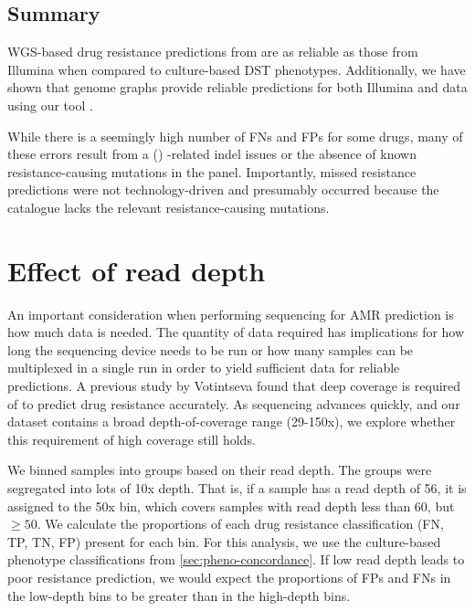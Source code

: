 \subsection{Summary}

WGS-based drug resistance predictions from \ont{} are as reliable as those from Illumina when compared to culture-based DST phenotypes. Additionally, we have shown that genome graphs provide reliable predictions for both Illumina and \ont{} data using our tool \drprg{}.

While there is a seemingly high number of FNs and FPs for some drugs, many of these errors result from a (\mykrobe{}) \ont{}-related indel issues or the absence of known resistance-causing mutations in the panel. Importantly, missed resistance predictions were not technology-driven and presumably occurred because the catalogue lacks the relevant resistance-causing mutations.

\section{Effect of \ont{} read depth}
\label{sec:dst-covg}

An important consideration when performing \ont{} sequencing for AMR prediction is how much data is needed. The quantity of data required has implications for how long the \ont{} sequencing device needs to be run or how many samples can be multiplexed in a single run in order to yield sufficient data for reliable predictions. A previous study by Votintseva \etal{} found that deep coverage is required of \ont{} to predict drug resistance accurately\cite{Votintseva2017}. As \ont{} sequencing advances quickly, and our dataset contains a broad \ont{} depth-of-coverage range (29-150x), we explore whether this requirement of high coverage still holds. 

We binned samples into groups based on their read depth. The groups were segregated into lots of 10x depth. That is, if a sample has a read depth of 56, it is assigned to the 50x bin, which covers samples with read depth less than 60, but $\ge50$. We calculate the proportions of each drug resistance classification (FN, TP, TN, FP) present for each bin. For this analysis, we use the culture-based phenotype classifications from \autoref{sec:pheno-concordance}. If low read depth leads to poor resistance prediction, we would expect the proportions of FPs and FNs in the low-depth bins to be greater than in the high-depth bins. 

